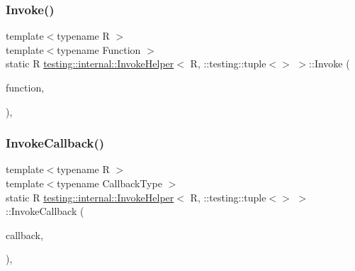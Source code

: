 \subsubsection{\texorpdfstring{Invoke()}{Invoke()}}
{\footnotesize\ttfamily template$<$typename R $>$ \\
template$<$typename Function $>$ \\
static R \mbox{\hyperlink{classtesting_1_1internal_1_1_invoke_helper}{testing\+::internal\+::\+Invoke\+Helper}}$<$ R, \+::testing\+::tuple$<$$>$ $>$\+::Invoke (\begin{DoxyParamCaption}\item[{\mbox{\hyperlink{structtesting_1_1internal_1_1_function}{Function}}}]{function,  }\item[{const \+::testing\+::tuple$<$$>$ \&}]{ }\end{DoxyParamCaption})\hspace{0.3cm}{\ttfamily [inline]}, {\ttfamily [static]}}

\mbox{\label{classtesting_1_1internal_1_1_invoke_helper_3_01_r_00_01_1_1testing_1_1tuple_3_4_01_4_a9d81d455ebad0e8bf02a7d04c07ccb20}} 
\subsubsection{\texorpdfstring{InvokeCallback()}{InvokeCallback()}}
{\footnotesize\ttfamily template$<$typename R $>$ \\
template$<$typename Callback\+Type $>$ \\
static R \mbox{\hyperlink{classtesting_1_1internal_1_1_invoke_helper}{testing\+::internal\+::\+Invoke\+Helper}}$<$ R, \+::testing\+::tuple$<$$>$ $>$\+::Invoke\+Callback (\begin{DoxyParamCaption}\item[{Callback\+Type $\ast$}]{callback,  }\item[{const \+::testing\+::tuple$<$$>$ \&}]{ }\end{DoxyParamCaption})\hspace{0.3cm}{\ttfamily [inline]}, {\ttfamily [static]}}

